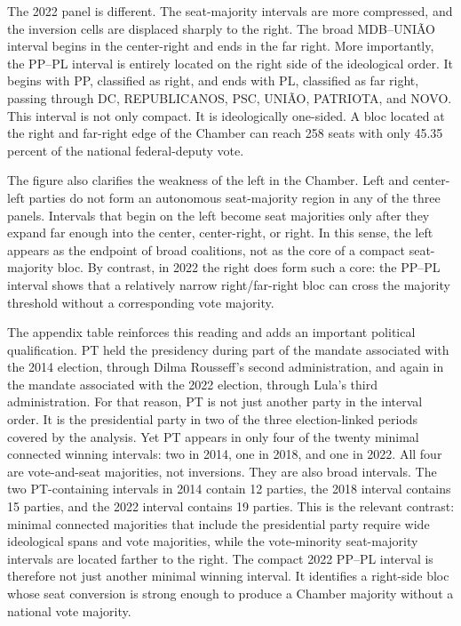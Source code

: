 \documentclass[11pt]{article}
\begin{document}
The 2022 panel is different. The seat-majority intervals are more compressed,
and the inversion cells are displaced sharply to the right. The broad
MDB--UNIÃO interval begins in the center-right and ends in the far right. More
importantly, the PP--PL interval is entirely located on the right side of the
ideological order. It begins with PP, classified as right, and ends with PL,
classified as far right, passing through DC, REPUBLICANOS, PSC, UNIÃO,
PATRIOTA, and NOVO. This interval is not only compact. It is ideologically
one-sided. A bloc located at the right and far-right edge of the Chamber can
reach 258 seats with only 45.35 percent of the national federal-deputy vote.

The figure also clarifies the weakness of the left in the Chamber. Left and
center-left parties do not form an autonomous seat-majority region in any of
the three panels. Intervals that begin on the left become seat majorities only
after they expand far enough into the center, center-right, or right. In this
sense, the left appears as the endpoint of broad coalitions, not as the core of a
compact seat-majority bloc. By contrast, in 2022 the right does form such a
core: the PP--PL interval shows that a relatively narrow right/far-right bloc can
cross the majority threshold without a corresponding vote majority.

The appendix table reinforces this reading and adds an important political
qualification. PT held the presidency during part of the mandate associated with
the 2014 election, through Dilma Rousseff's second administration, and again in
the mandate associated with the 2022 election, through Lula's third
administration. For that reason, PT is not just another party in the interval
order. It is the presidential party in two of the three election-linked periods
covered by the analysis. Yet PT appears in only four of the twenty
minimal connected winning intervals: two in 2014, one in 2018, and one
in 2022. All four are vote-and-seat majorities, not inversions. They are also
broad intervals. The two PT-containing intervals in 2014 contain 12 parties, the
2018 interval contains 15 parties, and the 2022 interval contains 19 parties.
This is the relevant contrast: minimal connected majorities that include the
presidential party require wide ideological spans and vote majorities, while the
vote-minority seat-majority intervals are located farther to the right. The
compact 2022 PP--PL interval is therefore not just another minimal winning
interval. It identifies a right-side bloc whose seat conversion is strong enough
to produce a Chamber majority without a national vote majority.
\end{document}
